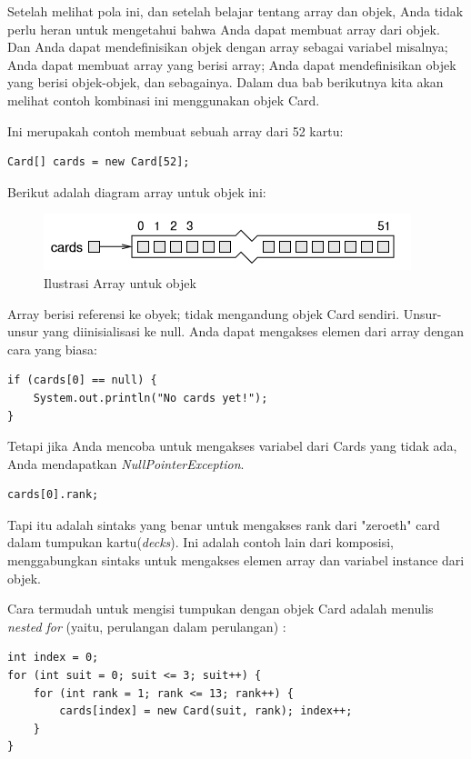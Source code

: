 \noindent Setelah melihat pola ini, dan setelah belajar tentang array dan objek, Anda tidak perlu heran untuk mengetahui bahwa Anda dapat membuat array dari objek. Dan Anda dapat mendefinisikan objek dengan array sebagai variabel misalnya; Anda dapat membuat array yang berisi array;
Anda dapat mendefinisikan objek yang berisi objek-objek, dan sebagainya. Dalam dua bab berikutnya kita akan melihat contoh kombinasi ini menggunakan objek Card.

\noindent Ini merupakah contoh membuat sebuah array dari 52 kartu:
\begin{lstlisting}
Card[] cards = new Card[52];
\end{lstlisting}

\noindent Berikut adalah diagram array untuk objek ini:
\begin{figure}[h!]
\centering
\includegraphics[scale=0.7]{diagram_array3.png}
\caption{Ilustrasi Array untuk objek}
\label{fig:univerise3}
\end{figure}

\noindent Array berisi referensi ke obyek; tidak mengandung objek Card sendiri. Unsur-unsur yang diinisialisasi ke null. Anda dapat mengakses elemen dari array dengan cara yang biasa:
\begin{lstlisting}
if (cards[0] == null) { 
    System.out.println("No cards yet!"); 
}
\end{lstlisting}
\noindent Tetapi jika Anda mencoba untuk mengakses variabel dari Cards yang tidak ada, Anda mendapatkan \textit{NullPointerException}.
\begin{lstlisting}
cards[0].rank;
\end{lstlisting}

\noindent Tapi itu adalah sintaks yang benar untuk mengakses rank dari "zeroeth" card dalam tumpukan kartu(\textit{decks}). Ini adalah contoh lain dari komposisi, menggabungkan sintaks untuk mengakses elemen array dan variabel instance dari objek.

\noindent Cara termudah untuk mengisi tumpukan dengan objek Card adalah menulis \textit{nested for} (yaitu, perulangan dalam perulangan) : 
\begin{lstlisting}
int index = 0; 
for (int suit = 0; suit <= 3; suit++) { 
    for (int rank = 1; rank <= 13; rank++) { 
        cards[index] = new Card(suit, rank); index++; 
    } 
}
\end{lstlisting}

